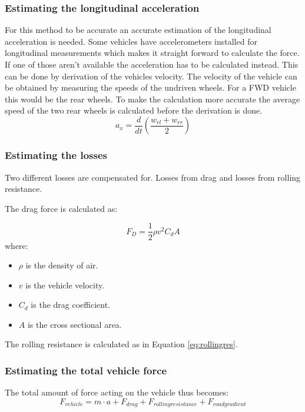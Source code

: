 \subsubsection{Estimating the longitudinal acceleration}
\label{longaccest}
For this method to be accurate an accurate estimation of the longitudinal acceleration is needed. Some vehicles have accelerometers installed for longitudinal measurements which makes it straight forward to calculate the force. If one of those aren't available the acceleration has to be calculated instead. This can be done by derivation of the vehicles velocity. The velocity of the vehicle can be obtained by measuring the speeds of the undriven wheels. For a FWD vehicle this would be the rear wheels. To make the calculation more accurate the average speed of the two rear wheels is calculated before the derivation is done.
\begin{equation}
a_{x} = \frac{d}{dt}(\frac{w_{rl}+w_{rr}}{2})
\end{equation}

\subsubsection{Estimating the losses}
Two different losses are compensated for. Losses from drag and losses from rolling resistance.

The drag force is calculated as:

\begin{equation}
F_{D}=\frac{1}{2}\rho v^2 C_{d}A
\end{equation}
where:
\begin{itemize}
	\item $ \rho $ is the density of air.
	\item $ v $ is the vehicle velocity.
	\item $ C_{d} $ is the drag coefficient.
	\item $ A $ is the cross sectional area.
\end{itemize}
The rolling resistance is calculated as in Equation \ref{eq:rollingres}.

\subsubsection{Estimating the total vehicle force}
The total amount of force acting on the vehicle thus becomes:
\begin{equation}
\label{eq:newton}
F_{vehicle} = m \cdot a + F_{drag} + F_{rolling resistance} + F_{road gradient}
\end{equation}


